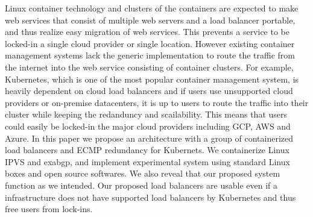 \begin{summary}
Linux container technology and clusters of the containers are expected to make web services that consist of multiple web servers and a load balancer portable, and thus realize easy migration of web services.
This prevents a service to be locked-in a single cloud provider or single location.
However existing container management systems lack the generic implementation to route the traffic from the internet into the web service consisting of container clusters.
For example, Kubernetes, which is one of the most popular container management system, is heavily dependent on cloud load balancers and if users use unsupported cloud providers or on-premise datacenters, it is up to users to route the traffic into their cluster while keeping the redanduncy and scailability.
This means that users could easily be locked-in the major cloud providers including GCP, AWS and Azure.
In this paper we propose an architecture with a group of containerized load balancers and ECMP redundancy for Kubernets.
We containerize Linux IPVS and exabgp, and implement experimental system using standard Linux boxes and open source softwares.
We also reveal that our proposed system function as we intended.
Our proposed load balancers are usable even if a infrastructure does not have supported load balancers by Kubernetes and thus free users from lock-ins.
\end{summary}
